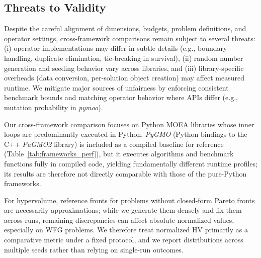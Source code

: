 \documentclass[journal]{IEEEtran}
\newcommand{\VAMOS}{VAMOS}
\begin{document}


\subsection{Threats to Validity}

Despite the careful alignment of dimensions, budgets, problem definitions, and operator settings, cross-framework comparisons remain subject to several threats: (i) operator implementations may differ in subtle details (e.g., boundary handling, duplicate elimination, tie-breaking in survival), (ii) random number generation and seeding behavior vary across libraries, and (iii) library-specific overheads (data conversion, per-solution object creation) may affect measured runtime. We mitigate major sources of unfairness by enforcing consistent benchmark bounds and matching operator behavior where APIs differ (e.g., mutation probability in \textit{pymoo}).


Our cross-framework comparison focuses on Python MOEA libraries whose inner loops are predominantly executed in Python. \textit{PyGMO} (Python bindings to the C++ \textit{PaGMO2} library) is included as a compiled baseline for reference (Table~\ref{tab:frameworks_perf}), but it executes algorithms and benchmark functions fully in compiled code, yielding fundamentally different runtime profiles; its results are therefore not directly comparable with those of the pure-Python frameworks.

For hypervolume, reference fronts for problems without closed-form Pareto fronts are necessarily approximations; while we generate them densely and fix them across runs, remaining discrepancies can affect absolute normalized values, especially on WFG problems. We therefore treat normalized HV primarily as a comparative metric under a fixed protocol, and we report distributions across multiple seeds rather than relying on single-run outcomes.
\end{document}

